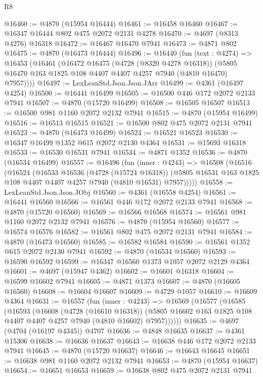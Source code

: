 \begin{lexlean}{R8}
\begin{coremodule}
@16460 := @4870 (@15954 @16444)
@16461 := @16458 @16460
@16467 := @16347 @16444 @802 @475 @2072 @2131 @4278
@16470 := @4697 (@8313 @4276) @16318
@16472 := @16467 @16470 @7941
@16473 := @4871 @802
@16475 := @4870 (@16473 @16444)
@16496 := @16440
    (fun (text : @4274) =>
    @16453
      (@16461
        (@16472
          @16475
          (@4728 (@8320 @4278 @16318))
          (@5805 @16470 @163 @1825 @108 @4407 @4407 @4257 @7940 (@4810 @16470) @7957))))
@16497 := LexLeanStd.Json.Json.JArr
@16499 := @4361 (@16497 @4254)
@16500 := @16441 @16499
@16505 := @16500 @446 @172 @2072 @2133 @7941
@16507 := @4870 (@15720 @16499)
@16508 := @16505 @16507
@16513 := @16500 @981 @1160 @2072 @2132 @7941
@16515 := @4870 (@15954 @16499)
@16516 := @16513 @16515
@16521 := @16500 @802 @475 @2072 @2131 @7941
@16523 := @4870 (@16473 @16499)
@16524 := @16521 @16523
@16530 := @16347 @16499 @1352 @615 @2072 @2130 @4364
@16531 := @15693 @16318
@16533 := @16530 @16531 @7941
@16534 := @4871 @1352
@16536 := @4870 (@16534 @16499)
@16557 := @16496
    (fun (inner : @4243) =>
    @16508
      (@16516
        (@16524
          (@16533
            @16536
            (@4728 (@15724 @16318))
            (@5805 @16531 @163 @1825 @108 @4407 @4407 @4257 @7940 (@4810 @16531) @7957)))))
@16558 := LexLeanStd.Json.Json.JObj
@16560 := @4361 (@16558 @4254)
@16561 := @16441 @16560
@16566 := @16561 @446 @172 @2072 @2133 @7941
@16568 := @4870 (@15720 @16560)
@16569 := @16566 @16568
@16574 := @16561 @981 @1160 @2072 @2132 @7941
@16576 := @4870 (@15954 @16560)
@16577 := @16574 @16576
@16582 := @16561 @802 @475 @2072 @2131 @7941
@16584 := @4870 (@16473 @16560)
@16585 := @16582 @16584
@16590 := @16561 @1352 @615 @2072 @2130 @7941
@16592 := @4870 (@16534 @16560)
@16593 := @16590 @16592
@16599 := @16347 @16560 @1373 @1057 @2072 @2129 @4364
@16601 := @4697 (@15947 @4362)
@16602 := @16601 @16318
@16604 := @16599 @16602 @7941
@16605 := @4871 @1373
@16607 := @4870 (@16605 @16560)
@16608 := @16604 @16607
@16609 := @4729 @1057
@16610 := @16609 @4364
@16631 := @16557
    (fun (inner : @4243) =>
    @16569
      (@16577
        (@16585
          (@16593
            (@16608
              (@4728 (@16610 @16318))
              (@5805 @16602 @163 @1825 @108 @4407 @4407 @4257 @7940 (@4810 @16602) @7957))))))
@16635 := @4697 (@4704 (@16197 @4345)) @4707
@16636 := @4848 @16635
@16637 := @4361 @15306
@16638 := @16636 @16637
@16643 := @16638 @446 @172 @2072 @2133 @7941
@16645 := @4870 (@15720 @16637)
@16646 := @16643 @16645
@16651 := @16638 @981 @1160 @2072 @2132 @7941
@16653 := @4870 (@15954 @16637)
@16654 := @16651 @16653
@16659 := @16638 @802 @475 @2072 @2131 @7941

\end{coremodule}
\end{lexlean}
